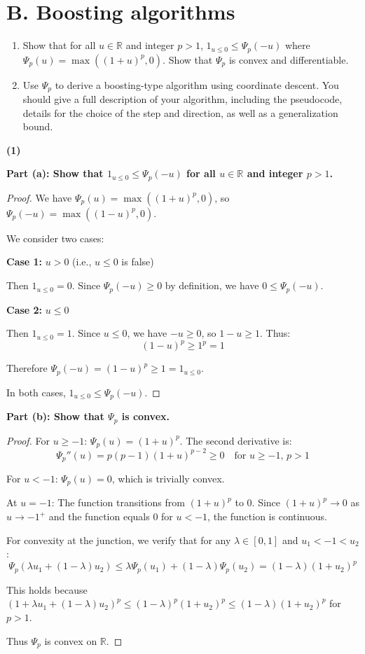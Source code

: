 \documentclass[letterpaper, 11pt]{article}
\newcommand{\1}{\mathds{1}}	%
\theoremstyle{definition}
\begin{document}
\section*{B. Boosting algorithms}

\begin{enumerate}
    \item Show that for all $u \in \mathbb{R}$ and integer $p > 1$, $1_{u \leq 0} \leq \Psi_p(-u)$ where $\Psi_p(u) = \max((1+u)^p, 0)$. Show that $\Psi_p$ is convex and differentiable.
    
    \item Use $\Psi_p$ to derive a boosting-type algorithm using coordinate descent. You should give a full description of your algorithm, including the pseudocode, details for the choice of the step and direction, as well as a generalization bound.
\end{enumerate}

\textbf{(1)}

\textbf{Part (a): Show that $1_{u \leq 0} \leq \Psi_p(-u)$ for all $u \in \mathbb{R}$ and integer $p > 1$.}

\begin{proof}
We have $\Psi_p(u) = \max((1+u)^p, 0)$, so $\Psi_p(-u) = \max((1-u)^p, 0)$.

We consider two cases:

\textbf{Case 1:} $u > 0$ (i.e., $u \leq 0$ is false)

Then $1_{u \leq 0} = 0$. Since $\Psi_p(-u) \geq 0$ by definition, we have $0 \leq \Psi_p(-u)$. \checkmark

\textbf{Case 2:} $u \leq 0$

Then $1_{u \leq 0} = 1$. Since $u \leq 0$, we have $-u \geq 0$, so $1 - u \geq 1$. Thus:
$$(1-u)^p \geq 1^p = 1$$

Therefore $\Psi_p(-u) = (1-u)^p \geq 1 = 1_{u \leq 0}$. \checkmark

In both cases, $1_{u \leq 0} \leq \Psi_p(-u)$.
\end{proof}

\textbf{Part (b): Show that $\Psi_p$ is convex.}

\begin{proof}
For $u \geq -1$: $\Psi_p(u) = (1+u)^p$. The second derivative is:
$$\Psi_p''(u) = p(p-1)(1+u)^{p-2} \geq 0 \quad \text{for } u \geq -1, \, p > 1$$

For $u < -1$: $\Psi_p(u) = 0$, which is trivially convex.

At $u = -1$: The function transitions from $(1+u)^p$ to $0$. Since $(1+u)^p \to 0$ as $u \to -1^+$ and the function equals $0$ for $u < -1$, the function is continuous.

For convexity at the junction, we verify that for any $\lambda \in [0,1]$ and $u_1 < -1 < u_2$:
$$\Psi_p(\lambda u_1 + (1-\lambda)u_2) \leq \lambda \Psi_p(u_1) + (1-\lambda)\Psi_p(u_2) = (1-\lambda)(1+u_2)^p$$

This holds because $(1 + \lambda u_1 + (1-\lambda)u_2)^p \leq (1-\lambda)^p(1+u_2)^p \leq (1-\lambda)(1+u_2)^p$ for $p > 1$.

Thus $\Psi_p$ is convex on $\mathbb{R}$.
\end{proof}
\end{document}
